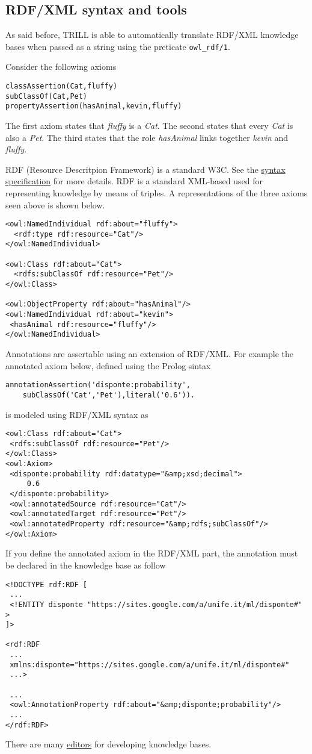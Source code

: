 \subsection{RDF/XML syntax and tools}
\label{rdfxml-syn}
As said before, TRILL is able to automatically translate RDF/XML knowledge bases when passed as a string using 
the preticate \verb|owl_rdf/1|.

Consider the following axioms 

\begin{verbatim}
classAssertion(Cat,fluffy)
subClassOf(Cat,Pet)
propertyAssertion(hasAnimal,kevin,fluffy)
\end{verbatim}

The first axiom states that \textit{fluffy} is a \textit{Cat}. The second states that every \textit{Cat} is also a \textit{Pet}. The third states that the role \textit{hasAnimal} links together \textit{kevin} and \textit{fluffy}.

RDF (Resource Descritpion Framework) is a standard W3C. See the \href{http://www.w3.org/TR/REC-rdf-syntax/}{syntax specification} for more details.
RDF is a standard XML-based used for representing knowledge by means of triples.
A representations of the three axioms seen above is shown below.
\begin{verbatim}
<owl:NamedIndividual rdf:about="fluffy">
  <rdf:type rdf:resource="Cat"/>
</owl:NamedIndividual>

<owl:Class rdf:about="Cat">
  <rdfs:subClassOf rdf:resource="Pet"/>
</owl:Class>

<owl:ObjectProperty rdf:about="hasAnimal"/>
<owl:NamedIndividual rdf:about="kevin">
 <hasAnimal rdf:resource="fluffy"/>
</owl:NamedIndividual>
\end{verbatim}

Annotations are assertable using an extension of RDF/XML. For example the annotated axiom below, defined using the Prolog sintax
\begin{verbatim}
annotationAssertion('disponte:probability',
    subClassOf('Cat','Pet'),literal('0.6')).
\end{verbatim}
is modeled using RDF/XML syntax as
\begin{verbatim}
<owl:Class rdf:about="Cat">
 <rdfs:subClassOf rdf:resource="Pet"/>
</owl:Class>
<owl:Axiom>
 <disponte:probability rdf:datatype="&amp;xsd;decimal">
     0.6
 </disponte:probability>
 <owl:annotatedSource rdf:resource="Cat"/>
 <owl:annotatedTarget rdf:resource="Pet"/>
 <owl:annotatedProperty rdf:resource="&amp;rdfs;subClassOf"/>
</owl:Axiom>
\end{verbatim}
If you define the annotated axiom in the RDF/XML part, the annotation must be declared in the knowledge base as follow
\begin{verbatim}
<!DOCTYPE rdf:RDF [
 ...
 <!ENTITY disponte "https://sites.google.com/a/unife.it/ml/disponte#" >
]>

<rdf:RDF
 ...
 xmlns:disponte="https://sites.google.com/a/unife.it/ml/disponte#"
 ...>

 ...
 <owl:AnnotationProperty rdf:about="&amp;disponte;probability"/>
 ...
</rdf:RDF>
\end{verbatim}

There are many \href{http://www.w3.org/2001/sw/wiki/Category:Editor}{editors} for developing knowledge bases.
